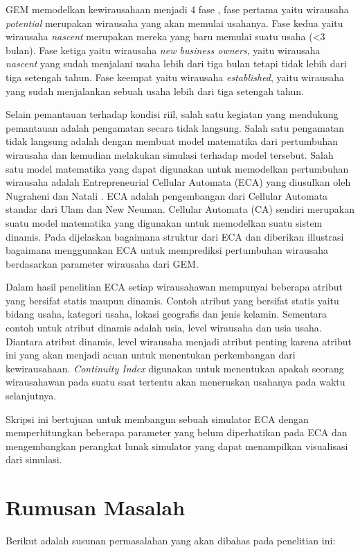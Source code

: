 GEM memodelkan kewirausahaan menjadi 4 fase \cite{GEM2013}, fase pertama yaitu wirausaha \textit{potential} merupakan wirausaha yang akan memulai usahanya. Fase kedua yaitu wirausaha \textit{nascent} merupakan mereka yang baru memulai suatu usaha (<3 bulan). Fase ketiga yaitu wirausaha \textit{new business owners}, yaitu wirausaha \textit{nascent} yang sudah menjalani usaha lebih dari tiga bulan tetapi tidak lebih dari tiga setengah tahun. Fase keempat yaitu wirausaha \textit{established}, yaitu wirausaha yang sudah menjalankan sebuah usaha lebih dari tiga setengah tahun.


Selain pemantauan terhadap kondisi riil, salah satu kegiatan yang mendukung pemantauan adalah pengamatan secara tidak langsung. Salah satu pengamatan tidak langsung adalah dengan membuat model matematika dari pertumbuhan wirausaha dan kemudian melakukan simulasi terhadap model tersebut. Salah satu model matematika yang dapat digunakan untuk memodelkan pertumbuhan wirausaha adalah Entrepreneurial Cellular Automata (ECA) yang diusulkan oleh Nugraheni dan Natali \cite{ECA}. ECA adalah pengembangan dari Cellular Automata standar dari Ulam dan New Neuman. Cellular Automata (CA) sendiri merupakan suatu model matematika yang digunakan untuk memodelkan suatu sistem dinamis. Pada \cite{ECA} dijelaskan bagaimana struktur dari ECA dan diberikan illustrasi bagaimana menggunakan ECA untuk memprediksi pertumbuhan wirausaha berdasarkan parameter wirausaha dari GEM. 


Dalam hasil penelitian ECA setiap wirausahawan mempunyai beberapa atribut yang bersifat statis maupun dinamis. Contoh atribut yang bersifat statis yaitu bidang usaha, kategori usaha, lokasi geografis dan jenis kelamin. Sementara contoh untuk atribut dinamis adalah usia, level wirausaha dan usia usaha. Diantara atribut dinamis, level wirausaha menjadi atribut penting karena atribut ini yang akan menjadi acuan untuk menentukan perkembangan dari kewirausahaan. \textit{Continuity Index} digunakan untuk menentukan apakah seorang wirausahawan pada suatu saat tertentu akan meneruskan usahanya pada waktu selanjutnya.


Skripsi ini bertujuan untuk membangun sebuah simulator ECA dengan memperhitungkan beberapa parameter yang belum diperhatikan pada ECA dan mengembangkan perangkat lunak simulator yang dapat menampilkan visualisasi dari simulasi.



\section{Rumusan Masalah}
\label{sec:rumusan}
Berikut adalah susunan permasalahan yang akan dibahas pada penelitian ini:


